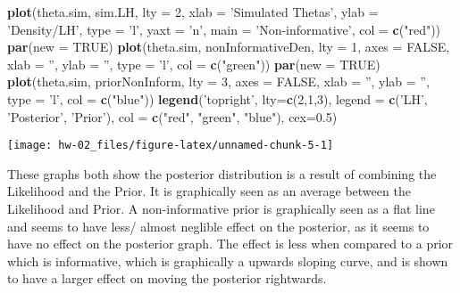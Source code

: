 \documentclass[
]{article}
\newenvironment{Shaded}{\begin{snugshade}}{\end{snugshade}}
\newcommand{\DataTypeTok}[1]{\textcolor[rgb]{0.13,0.29,0.53}{#1}}
\newcommand{\DecValTok}[1]{\textcolor[rgb]{0.00,0.00,0.81}{#1}}
\newcommand{\FloatTok}[1]{\textcolor[rgb]{0.00,0.00,0.81}{#1}}
\newcommand{\KeywordTok}[1]{\textcolor[rgb]{0.13,0.29,0.53}{\textbf{#1}}}
\newcommand{\NormalTok}[1]{#1}
\newcommand{\OtherTok}[1]{\textcolor[rgb]{0.56,0.35,0.01}{#1}}
\newcommand{\StringTok}[1]{\textcolor[rgb]{0.31,0.60,0.02}{#1}}
\begin{document}
\begin{Shaded}
\begin{Highlighting}[]
\KeywordTok{plot}\NormalTok{(theta.sim, sim.LH, }\DataTypeTok{lty =} \DecValTok{2}\NormalTok{, }\DataTypeTok{xlab =} \StringTok{'Simulated Thetas'}\NormalTok{,}
 \DataTypeTok{ylab =} \StringTok{'Density/LH'}\NormalTok{, }\DataTypeTok{type =} \StringTok{'l'}\NormalTok{, }\DataTypeTok{yaxt =} \StringTok{'n'}\NormalTok{, }\DataTypeTok{main =} \StringTok{'Non-informative'}\NormalTok{, }
 \DataTypeTok{col =} \KeywordTok{c}\NormalTok{(}\StringTok{"red"}\NormalTok{))}
\KeywordTok{par}\NormalTok{(}\DataTypeTok{new =} \OtherTok{TRUE}\NormalTok{)}
\KeywordTok{plot}\NormalTok{(theta.sim, nonInformativeDen, }\DataTypeTok{lty =} \DecValTok{1}\NormalTok{, }\DataTypeTok{axes =} \OtherTok{FALSE}\NormalTok{, }\DataTypeTok{xlab =} \StringTok{''}\NormalTok{, }\DataTypeTok{ylab =} \StringTok{''}\NormalTok{,}
 \DataTypeTok{type =} \StringTok{'l'}\NormalTok{, }\DataTypeTok{col =} \KeywordTok{c}\NormalTok{(}\StringTok{"green"}\NormalTok{))}
\KeywordTok{par}\NormalTok{(}\DataTypeTok{new =} \OtherTok{TRUE}\NormalTok{)}
\KeywordTok{plot}\NormalTok{(theta.sim, priorNonInform, }\DataTypeTok{lty =} \DecValTok{3}\NormalTok{, }\DataTypeTok{axes =} \OtherTok{FALSE}\NormalTok{, }\DataTypeTok{xlab =} \StringTok{''}\NormalTok{, }\DataTypeTok{ylab =} \StringTok{''}\NormalTok{,}
 \DataTypeTok{type =} \StringTok{'l'}\NormalTok{, }\DataTypeTok{col =} \KeywordTok{c}\NormalTok{(}\StringTok{"blue"}\NormalTok{))}
\KeywordTok{legend}\NormalTok{(}\StringTok{'topright'}\NormalTok{, }\DataTypeTok{lty=}\KeywordTok{c}\NormalTok{(}\DecValTok{2}\NormalTok{,}\DecValTok{1}\NormalTok{,}\DecValTok{3}\NormalTok{), }\DataTypeTok{legend =} \KeywordTok{c}\NormalTok{(}\StringTok{'LH'}\NormalTok{, }\StringTok{'Posterior'}\NormalTok{, }\StringTok{'Prior'}\NormalTok{), }
       \DataTypeTok{col =} \KeywordTok{c}\NormalTok{(}\StringTok{"red"}\NormalTok{, }\StringTok{"green"}\NormalTok{, }\StringTok{"blue"}\NormalTok{), }\DataTypeTok{cex=}\FloatTok{0.5}\NormalTok{)}
\end{Highlighting}
\end{Shaded}

\begin{center}\texttt{[image: hw-02\_files/figure-latex/unnamed-chunk-5-1]} \end{center}

These graphs both show the posterior distribution is a result of
combining the Likelihood and the Prior. It is graphically seen as an
average between the Likelihood and Prior. A non-informative prior is
graphically seen as a flat line and seems to have less/ almost neglible
effect on the posterior, as it seems to have no effect on the posterior
graph. The effect is less when compared to a prior which is informative,
which is graphically a upwards sloping curve, and is shown to have a
larger effect on moving the posterior rightwards.
\end{document}
